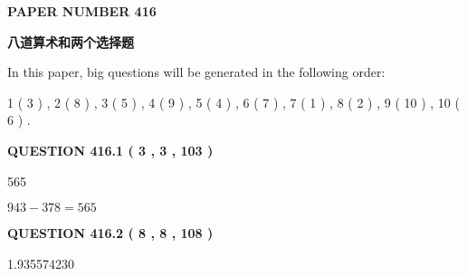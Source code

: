 \documentclass{ctexart}
\begin{document}
 
 
 
 
   
   
\newpage 
\setcounter{page}{ 
   416001 } 
   
   
   
   
 {\textbf{ \Large{ PAPER NUMBER  416  }}}
   
   
\vspace{0.2in}
   
   
   
   
   
   
 \vspace{0.2in}
{\LARGE {\textbf{ 八道算术和两个选择题}}}
   
   
   
\vspace{0.2in}
   
In this paper, big questions will be generated in the following order: 
   
   
   1 ( 3 )
 ,
   2 ( 8 )
 ,
   3 ( 5 )
 ,
   4 ( 9 )
 ,
   5 ( 4 )
 ,
   6 ( 7 )
 ,
   7 ( 1 )
 ,
   8 ( 2 )
 ,
   9 ( 10 )
 ,
   10 ( 6 )
 .
  
\vspace{0.2in}
  
{\textbf{\Large{QUESTION
416.1 
 ( 3 , 3 , 103 )
}}}
  
  
 
 
\noindent{}

565
 
 
 
 
\noindent{}

$ %
943 -  %
378=   %
565$
 
 
  
\vspace{0.2in}
  
{\textbf{\Large{QUESTION
416.2 
 ( 8 , 8 , 108 )
}}}
  
  
 
 
\noindent{}

1.935574230
 
 
 
 
\noindent{}
\end{document}
